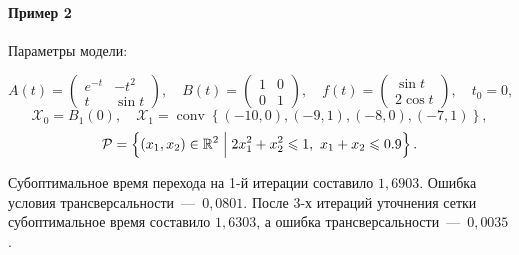 \documentclass[12pt, a4paper]{article} %
\renewcommand{\le}{\leqslant}
\newcommand{\Real}{\mathbb{R}}
\DeclareMathOperator{\conv}{conv}
\begin{document}
\paragraph{Пример 2}

Параметры модели:

\[
    A(t) = 
    \left(\begin{array}{cc}
            e^{-t} & -t^2 \\
            t & \sin t
    \end{array}\right), \quad 
    B(t) = \left(
    \begin{array}{cc}
        1 & 0 \\
        0 & 1
    \end{array} \right), \quad 
    f(t) = \left( 
        \begin{array}{cc}
        \sin t \\ 2\cos t
    \end{array} 
    \right), \quad t_0 = 0,
\]
\[
    \mathcal{X}_0 = B_1(0), \quad
    \mathcal{X}_1 = \conv \left\{ 
        (-10, 0), (-9, 1), (-8, 0), (-7, 1)
    \right\}
,\] 
\[
    \mathcal{P} = \left\{ (x_1, x_2) \in \Real^2 \Bigm| 
    2x_1^2 + x_2^2 \le 1,\
    x_1 + x_2 \le 0.9\right\}
.\] 

Субоптимальное время перехода на 1-й итерации составило $1{,}6903$.
Ошибка условия трансверсальности~---~$0{,}0801$.
После 3-х итераций уточнения сетки субоптимальное время составило 
$1{,}6303$, а ошибка трансверсальности~---~$0{,}0035$.
\end{document}
